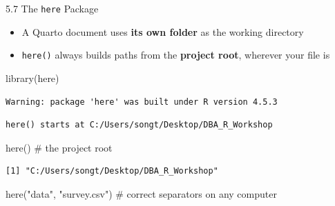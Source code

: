 \documentclass[
  ignorenonframetext,
  aspectratio=169,
]{beamer}
\newenvironment{Shaded}{\begin{snugshade}}{\end{snugshade}}
\newcommand{\CommentTok}[1]{\textcolor[rgb]{0.37,0.37,0.37}{#1}}
\newcommand{\FunctionTok}[1]{\textcolor[rgb]{0.28,0.35,0.67}{#1}}
\newcommand{\NormalTok}[1]{\textcolor[rgb]{0.00,0.23,0.31}{#1}}
\newcommand{\StringTok}[1]{\textcolor[rgb]{0.13,0.47,0.30}{#1}}
\providecommand{\tightlist}{%
  \setlength{\itemsep}{0pt}\setlength{\parskip}{0pt}}
\begin{document}
\begin{frame}[fragile]{5.7 The \texttt{here} Package}
\protect{}\label{sec-here}
\begin{itemize}
\tightlist
\item
  A Quarto document uses \textbf{its own folder} as the working
  directory
\item
  \texttt{here()} always builds paths from the \textbf{project root},
  wherever your file is
\end{itemize}

\begin{Shaded}
\begin{Highlighting}[]
\FunctionTok{library}\NormalTok{(here)}
\end{Highlighting}
\end{Shaded}

\begingroup\tiny\color{darkgray}

\begin{verbatim}
Warning: package 'here' was built under R version 4.5.3
\end{verbatim}

\endgroup

\begingroup\tiny\color{darkgray}

\begin{verbatim}
here() starts at C:/Users/songt/Desktop/DBA_R_Workshop
\end{verbatim}

\endgroup

\begin{Shaded}
\begin{Highlighting}[]
\FunctionTok{here}\NormalTok{()                          }\CommentTok{\# the project root}
\end{Highlighting}
\end{Shaded}

\begingroup\tiny\color{darkgray}

\begin{verbatim}
[1] "C:/Users/songt/Desktop/DBA_R_Workshop"
\end{verbatim}

\endgroup

\begin{Shaded}
\begin{Highlighting}[]
\FunctionTok{here}\NormalTok{(}\StringTok{"data"}\NormalTok{, }\StringTok{"survey.csv"}\NormalTok{)      }\CommentTok{\# correct separators on any computer}
\end{Highlighting}
\end{Shaded}


\end{frame}
\end{document}
